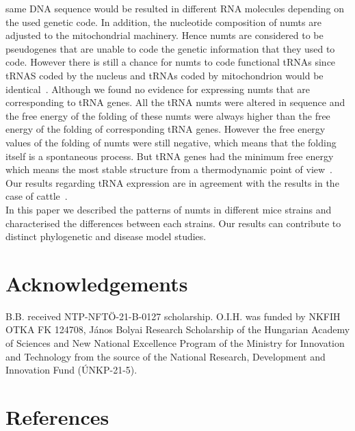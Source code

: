 \documentclass[a4paper,12pt]{article}
\numberwithin{equation}{section} %
\begin{document}
same DNA sequence would be resulted in different RNA molecules depending on the used genetic code. In addition, the nucleotide composition of numts are adjusted to the mitochondrial machinery. Hence numts are considered to be pseudogenes that are unable to code the genetic information that they used to code. However there is still a chance for numts to code functional tRNAs since tRNAS coded by the nucleus and tRNAs coded by mitochondrion would be identical~. Although we found no evidence for expressing numts that are corresponding to tRNA genes. All the tRNA numts were altered in sequence and the free energy of the folding of these numts were always higher than the free energy of the folding of corresponding tRNA genes. However the free energy values of the folding of numts were still negative, which means that the folding itself is a spontaneous process. But tRNA genes had the minimum free energy which means the most stable structure from a thermodynamic point of view~. Our results regarding tRNA expression are in agreement with the results in the case of cattle~.\\ \indent In this paper we described the patterns of numts in different mice strains and characterised the differences between each strains. Our results can contribute to distinct phylogenetic and disease model studies.

\section{Acknowledgements}
\indent B.B. received NTP-NFTÖ-21-B-0127 scholarship. O.I.H. was funded by NKFIH OTKA FK 124708, János Bolyai Research Scholarship of the Hungarian Academy of Sciences and New National Excellence Program of the Ministry for Innovation and Technology from the source of the National Research, Development and Innovation Fund (ÚNKP-21-5).
\section{References}
\renewcommand{\refname}{}


\end{document}
